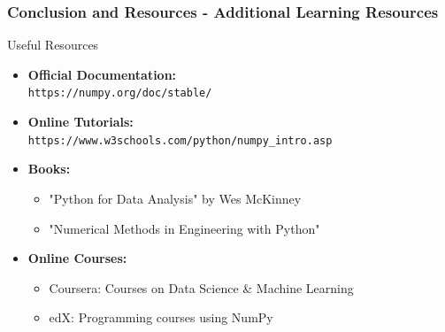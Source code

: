 \documentclass{beamer}
\begin{document}
\begin{frame}[fragile]
    \frametitle{Conclusion and Resources - Additional Learning Resources}
    
    \begin{block}{Useful Resources}
        \begin{itemize}
            \item \textbf{Official Documentation:} \\
            \texttt{https://numpy.org/doc/stable/}
            
            \item \textbf{Online Tutorials:} \\
            \texttt{https://www.w3schools.com/python/numpy_intro.asp}
            
            \item \textbf{Books:}
            \begin{itemize}
                \item "Python for Data Analysis" by Wes McKinney
                \item "Numerical Methods in Engineering with Python"
            \end{itemize}
            
            \item \textbf{Online Courses:}
            \begin{itemize}
                \item Coursera: Courses on Data Science & Machine Learning
                \item edX: Programming courses using NumPy
            \end{itemize}
        \end{itemize}
    \end{block}
\end{frame}
\end{document}
